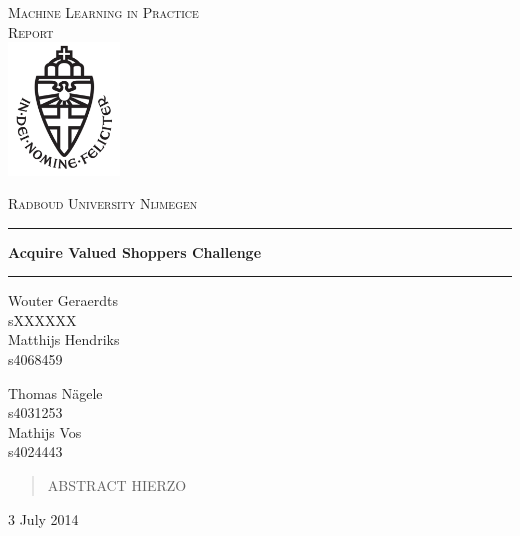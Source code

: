\documentclass[a4paper]{article}
\begin{document}
\begin{titlepage}
	\begin{center}
	\textsc{\LARGE Machine Learning in Practice\\}
	\textsc{\Large Report}\\[1.5cm]
	\includegraphics[height=100pt]{logo}
   
	\vspace{0.4cm}
	\textsc{\Large Radboud University Nijmegen}\\[.5cm]
	\hrule
	\vspace{0.4cm}
	\textbf{\huge Acquire Valued Shoppers Challenge}\\[0.4cm]
	\hrule
	\vspace{2cm}
	\begin{minipage}[t]{0.45\textwidth}
	\begin{flushleft} \large
	Wouter Geraerdts\\
	sXXXXXX\\[0.7cm]
	Matthijs Hendriks\\
	s4068459\\[0.7cm]
	\end{flushleft}
	\end{minipage}
	\begin{minipage}[t]{0.45\textwidth}
	\begin{flushright} \large
	Thomas N\"agele\\
	s4031253\\[0.7cm]
	Mathijs Vos\\
	s4024443\\[0.7cm]
	\end{flushright}
	\end{minipage}
	\vspace{.7cm}
	
	\begin{abstract}
		ABSTRACT HIERZO
	\end{abstract}
	\vspace{.7cm}

	{\large 3 July 2014}
	\vfill
	\end{center}

\end{titlepage}
\end{document}
